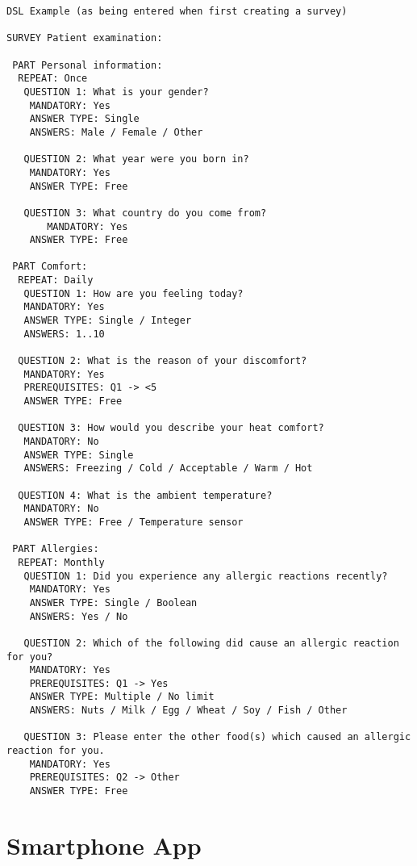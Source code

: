 \begin{verbatim}
DSL Example (as being entered when first creating a survey)

SURVEY Patient examination:

 PART Personal information:
  REPEAT: Once
   QUESTION 1: What is your gender?
    MANDATORY: Yes
    ANSWER TYPE: Single 
    ANSWERS: Male / Female / Other
      
   QUESTION 2: What year were you born in?
    MANDATORY: Yes
    ANSWER TYPE: Free

   QUESTION 3: What country do you come from?
       MANDATORY: Yes
    ANSWER TYPE: Free
      
 PART Comfort:
  REPEAT: Daily
   QUESTION 1: How are you feeling today?
   MANDATORY: Yes
   ANSWER TYPE: Single / Integer
   ANSWERS: 1..10
   
  QUESTION 2: What is the reason of your discomfort?
   MANDATORY: Yes
   PREREQUISITES: Q1 -> <5
   ANSWER TYPE: Free
 
  QUESTION 3: How would you describe your heat comfort?
   MANDATORY: No
   ANSWER TYPE: Single
   ANSWERS: Freezing / Cold / Acceptable / Warm / Hot
 
  QUESTION 4: What is the ambient temperature?
   MANDATORY: No
   ANSWER TYPE: Free / Temperature sensor
      
 PART Allergies:  
  REPEAT: Monthly
   QUESTION 1: Did you experience any allergic reactions recently?
    MANDATORY: Yes
    ANSWER TYPE: Single / Boolean
    ANSWERS: Yes / No
 
   QUESTION 2: Which of the following did cause an allergic reaction for you?
    MANDATORY: Yes
    PREREQUISITES: Q1 -> Yes
    ANSWER TYPE: Multiple / No limit
    ANSWERS: Nuts / Milk / Egg / Wheat / Soy / Fish / Other
 
   QUESTION 3: Please enter the other food(s) which caused an allergic reaction for you.
    MANDATORY: Yes
    PREREQUISITES: Q2 -> Other
    ANSWER TYPE: Free
\end{verbatim}

\section{Smartphone App}
\label{sec:app}
